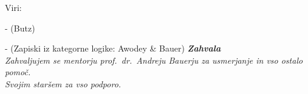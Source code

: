 \documentclass[../kategoricna_logika.tex]{subfiles}
\begin{document}
Viri:

- (Butz)

- (Zapiski iz kategorne logike: Awodey \& Bauer)
\vspace{15mm}
%
\vspace{2cm}
%
\clearemptydoublepage
%
\thispagestyle{empty}\mbox{}\vfill\null\it%
\vfill
{\Large \bf Zahvala}
\vspace{1cm}\\
Zahvaljujem se mentorju prof.\ dr.\ Andreju Bauerju za usmerjanje in vso ostalo pomoč. \\
Svojim staršem za vso podporo. \\
\rm\normalfont
%
\clearemptydoublepage
%


\pagestyle{empty}
\def\thepage{}%
\tableofcontents{}
%
\clearemptydoublepage
%
%
\end{document}
